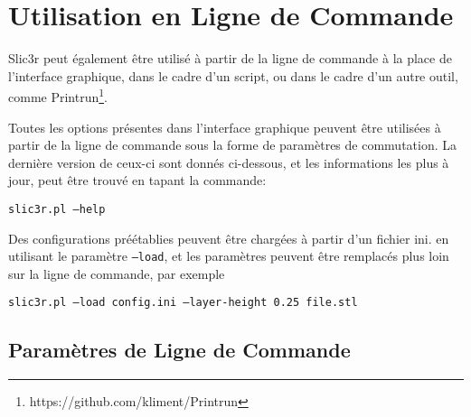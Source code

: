 
\section{Utilisation en Ligne de Commande} %
\label{sec:command_line_usage}

Slic3r peut également être utilisé à partir de la ligne de commande à la place de l'interface graphique, dans le cadre d'un script, ou dans le cadre d'un autre outil, comme Printrun\footnote{https://github.com/kliment/Printrun}.

Toutes les options présentes dans l'interface graphique peuvent être utilisées à partir de la ligne de commande sous la forme de paramètres de commutation. La dernière version de ceux-ci sont donnés ci-dessous, et les informations les plus à jour, peut être trouvé en tapant la commande: \par\texttt{slic3r.pl --help}

Des configurations préétablies peuvent être chargées à partir d'un fichier ini. en utilisant le paramètre \texttt{--load}, et les paramètres peuvent être remplacés plus loin sur la ligne de commande, par exemple \par\texttt{slic3r.pl --load config.ini --layer-height 0.25 file.stl}

\subsection{Paramètres de Ligne de Commande} %
\label{sub:command_line_options}


